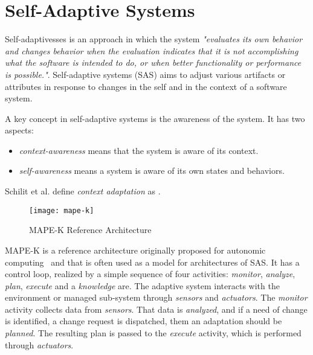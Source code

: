 \section{Self-Adaptive Systems}

Self-adaptivesses is an approach in which the system
\emph{"evaluates its own behavior and changes behavior when the evaluation indicates that it is not accomplishing what the software is intended to do, or when better functionality or performance is possible."}\cite{laddaga_self_1997}.
Self-adaptive systems (SAS) aims to adjust various artifacts or attributes in response to changes in the self and in the context of a software system\cite{salehie_self-adaptive_2009}.

A key concept in self-adaptive systems is the awareness of the system. It has two aspects\cite{salehie_self-adaptive_2009}:
\begin{itemize}
   \item \emph{context-awareness} means that the system is aware of its context.
   \item \emph{self-awareness} means a system is aware of its own states and behaviors.
\end{itemize}

Schilit et al.\cite{klein_survey_2008} define \emph{context adaptation} as .

\begin{figure}[!htb]
 \centering
 \texttt{[image: mape-k]}
 \caption{MAPE-K Reference Architecture}
\label{fig:mape-k}
\end{figure}

MAPE-K is a reference architecture originally proposed for autonomic computing~\cite{kephart_vision_2003} and that is often used as a model for architectures of SAS. It has a control loop, realized by a simple sequence of four activities: \emph{monitor}, \emph{analyze}, \emph{plan}, \emph{execute} and a \emph{knowledge} are. The adaptive system interacts with the environment or managed sub-system through \emph{sensors} and \emph{actuators}. The \emph{monitor} activity collects data from \emph{sensors}. That data
is \emph{analyzed}, and if a need of change is identified, a change request is dispatched, them an adaptation should be \emph{planned}. The resulting plan is passed to the \emph{execute} activity, which is performed through \emph{actuators}.

